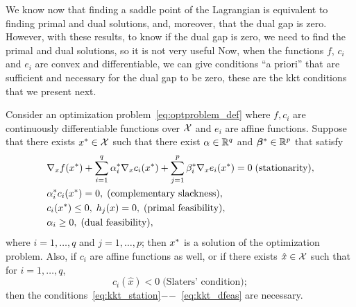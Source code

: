 %
We know now that finding a saddle point of the Lagrangian is equivalent to finding primal and dual solutions, and, moreover, that the dual gap is zero.
However, with these results, to know if the dual gap is zero, we need to find the primal and dual solutions, so it is not very useful
Now, when the functions $f$, $c_i$ and $e_i$ are convex and differentiable, we can give conditions ``a priori'' that are sufficient and necessary for the dual gap to be zero, these are the \acrshort{kkt} conditions that we present next.
\begin{theorem}\label{th:kkt_conditions}
    Consider an optimization problem~\eqref{eq:optproblem_def} where $f, c_i$ are continuously differentiable functions over $\mathcal{X}$ and $e_i$ are affine functions. Suppose that there exists ${x}^* \in \mathcal{X}$ such that there exist $\alpha \in \mathbb{R}^q$ and ${\bm{\beta}}^* \in \mathbb{R}^p$ that satisfy
    \begin{align}
        &\nabla_x f(\opt{x}) + \sum_{i=1}^q \opt{\alpha}_i \nabla_x c_i(\opt{x}) + \sum_{j=1}^p \opt{\beta}_i \nabla_x e_i(\opt{x}) = 0 \; \text{(stationarity)}, \label{eq:kkt_station} \\
        &\opt{\alpha}_i c_i(\opt{x}) = 0, \; \text{(complementary slackness)}, \label{eq:kkt_comp}\\
        &c_i(\opt{x}) \leq 0 , \; h_j(x) = 0, \; \text{(primal feasibility)}, \label{eq:kkt_pfeas}\\
        &\alpha_i \geq 0,\;  \text{(dual feasibility)} , \label{eq:kkt_dfeas}
    \end{align}  
    where $i=1, \ldots, q$ and $j=1, \ldots, p$; then ${x}^*$ is a solution of the optimization problem.
    Also, if $c_i$ are affine functions as well, or if there exists $\hat{x} \in \mathcal{X}$ such that for $i=1, \ldots, q$, 
    \begin{equation}
        \nonumber
        c_i(\hat{x}) < 0 \; \text{(Slaters' condition)};
    \end{equation}
    then the conditions~\eqref{eq:kkt_station}$--$~\eqref{eq:kkt_dfeas} are necessary.
\end{theorem}
